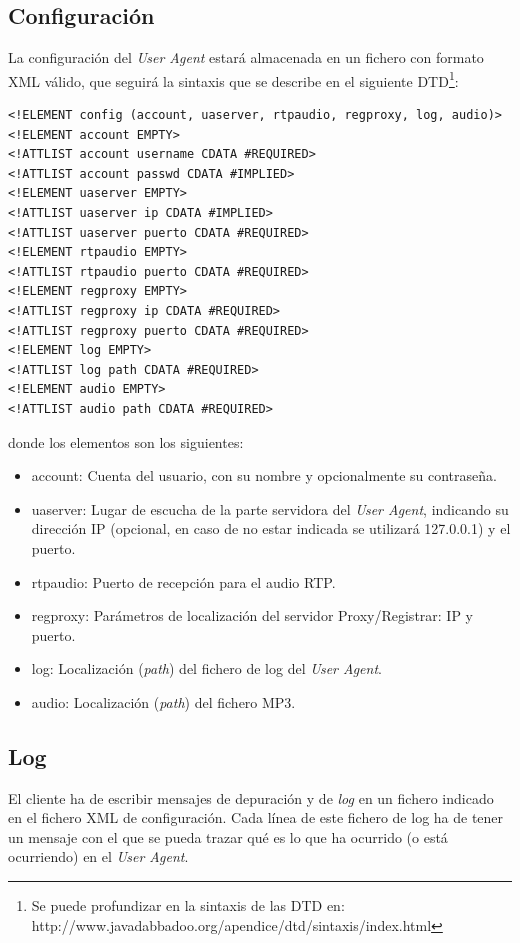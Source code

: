 \documentclass[a4paper,11pt]{article}
\begin{document}
\subsection{Configuración}

La configuración del \emph{User Agent} estará almacenada en un fichero
con formato XML válido, que seguirá 
la sintaxis que se describe en el  siguiente DTD\footnote{Se puede profundizar en la sintaxis de las DTD en: http://www.javadabbadoo.org/apendice/dtd/sintaxis/index.html}:

\begin{verbatim}
<!ELEMENT config (account, uaserver, rtpaudio, regproxy, log, audio)>
<!ELEMENT account EMPTY>
<!ATTLIST account username CDATA #REQUIRED>
<!ATTLIST account passwd CDATA #IMPLIED>
<!ELEMENT uaserver EMPTY>
<!ATTLIST uaserver ip CDATA #IMPLIED>
<!ATTLIST uaserver puerto CDATA #REQUIRED>
<!ELEMENT rtpaudio EMPTY>
<!ATTLIST rtpaudio puerto CDATA #REQUIRED>
<!ELEMENT regproxy EMPTY>
<!ATTLIST regproxy ip CDATA #REQUIRED>
<!ATTLIST regproxy puerto CDATA #REQUIRED>
<!ELEMENT log EMPTY>
<!ATTLIST log path CDATA #REQUIRED>
<!ELEMENT audio EMPTY>
<!ATTLIST audio path CDATA #REQUIRED>
\end{verbatim}

donde los elementos son los siguientes:

\begin{itemize}
  \item account: Cuenta del usuario, con su nombre y opcionalmente su contraseña.
  \item uaserver: Lugar de escucha de la parte servidora del \emph{User Agent}, indicando su dirección IP (opcional, en caso de no estar indicada se utilizará 127.0.0.1) y el puerto.
  \item rtpaudio: Puerto de recepción para el audio RTP.
  \item regproxy: Parámetros de localización del servidor Proxy/Registrar: IP y puerto.
  \item log: Localización (\emph{path}) del fichero de log del \emph{User Agent}.
  \item audio: Localización (\emph{path}) del fichero MP3.
\end{itemize}

\subsection{Log}


El cliente ha de escribir mensajes de depuración y de \emph{log} en un fichero indicado en el fichero XML de configuración. Cada línea de este fichero de log ha de tener un mensaje con el que se pueda trazar qué es lo que ha ocurrido (o está ocurriendo) en el \emph{User Agent}.
\end{document}
